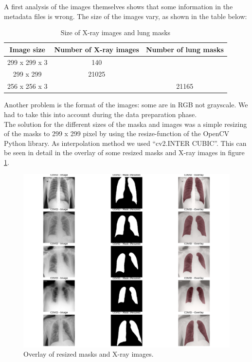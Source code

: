 \documentclass{article}
\begin{document}
A first analysis of the images themselves shows that some information in the metadata files is wrong. The size of the images vary, as shown in the table below:
\begin{table}[H]
    \centering
    \begin{tabular}{|c|c|c|}
        \hline
        \textbf{Image size} & \textbf{Number of X-ray images} & \textbf{Number of lung masks} \\ \hline
        299 x 299 x 3 & 140 &  \\ \hline
        299 x 299 & 21025 &  \\ \hline \hline
        256 x 256 x 3 &  & 21165 \\ \hline
    \end{tabular}
    \caption{Size of X-ray images and lung masks}
    \label{tab:iamges_sizes}
\end{table}
Another problem is the format of the images: some are in RGB not grayscale. We had to take this into account during the data preparation phase.\\
The solution for the different sizes of the maska and images was a simple resizing of the masks to 299 x 299 pixel by using the resize-function of the OpenCV Python library. As interpolation method we used “cv2.INTER CUBIC”. This can be seen in detail in the overlay of some resized masks and X-ray images in figure \ref{fig:overlay_masks_images}.

\begin{figure}[htb]
    \centering
    \includegraphics[width=1\linewidth]{overlay_masks_images.png}
    \caption{Overlay of resized masks and X-ray images.}
    \label{fig:overlay_masks_images}
\end{figure}   
\end{document}
